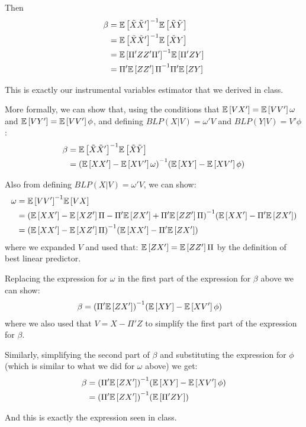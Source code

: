\documentclass[12pt]{paper}
\begin{document}
Then
\begin{align*}
  \beta &= \inv{ \exV{ \tilde{X} \tilde{X}'}} \exV{ \tilde{X} \tilde{Y}}\\
    &= \inv{ \exV{ \tilde{X} \tilde{X}'}} \exV{ \tilde{X} Y}\\
    &= \inv{ \exV{ \Pi'ZZ' \Pi' }} \exV{ \Pi'ZY}\\
    &= \inv{ \Pi' \exV{ZZ'} \Pi} \Pi' \exV{ZY}
\end{align*}

This is exactly our instrumental variables estimator that we derived
in class. 

More formally, we can show that, using the conditions that $\exV{VX'}=\exV{VV'}\omega$ and $\exV{VY'}=\exV{VV'}\phi$, and defining $BLP(X|V)=\omega'V$ and $BLP(Y|V)=V'\phi$:
\begin{align*}
  \beta &= \inv{ \exV{ \tilde{X} \tilde{X}'}} \exV{ \tilde{X}\tilde{Y}}\\
    &= \inv{(\exV{XX'}-\exV{XV'}\omega)}(\exV{XY}-\exV{XV'}\phi)
\end{align*}


Also from defining $BLP(X|V)=\omega'V$, we can show:
\begin{align*}
  \omega &= \inv{ \exV{ V V'}} \exV{ V X}\\
  &=\inv{(\exV{XX'}-\exV{XZ'}\Pi-\Pi'\exV{ZX'}+\Pi'\exV{ZZ'}\Pi)}(\exV{XX'}-\Pi'\exV{ZX'})\\
  &=\inv{(\exV{XX'}-\exV{XZ'}\Pi)}(\exV{XX'}-\Pi'\exV{ZX'})
\end{align*}
\noindent where we expanded $V$ and used that: $\exV{ZX'}=\exV{ZZ'}\Pi$ by the definition of best linear predictor.

Replacing the expression for $\omega$ in the first part of the expression for $\beta$ above we can show:
\begin{align*}
  \beta &= \inv{(\Pi'\exV{ZX'})}(\exV{XY}-\exV{XV'}\phi)
\end{align*}
\noindent where we also used that $V=X-\Pi'Z$ to simplify the first part of the expression for $\beta$.

Similarly, simplifying the second part of $\beta$ and substituting the expression for $\phi$ (which is similar to what we did for $\omega$ above) we get:
 \begin{align*}
  \beta &=\inv{(\Pi'\exV{ZX'})}(\exV{XY}-\exV{XV'}\phi)\\
  &=\inv{(\Pi'\exV{ZX'})}(\exV{\Pi'ZY})
\end{align*}

And this is exactly the expression seen in class.
\end{document}
